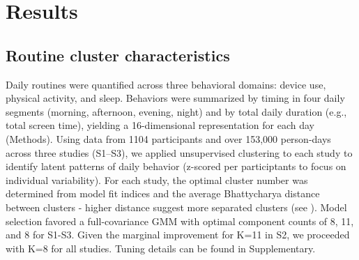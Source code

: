 \documentclass[pdflatex,sn-vancouver,Numbered]{bst/sn-jnl}%
\theoremstyle{thmstyleone}%
\theoremstyle{thmstyletwo}%
\theoremstyle{thmstylethree}%
\begin{document}
\section*{Results}\label{sec:results}  


\subsection*{Routine cluster characteristics}\label{sec:results:cluster}

Daily routines were quantified across three behavioral domains: device use, physical activity, and sleep. Behaviors were summarized by timing in four daily segments (morning, afternoon, evening, night) and by total daily duration (e.g., total screen time), yielding a 16-dimensional representation for each day (Methods). Using data from 1104 participants and over 153,000 person-days across three studies (S1–S3), we applied unsupervised clustering to each study to identify latent patterns of daily behavior (z-scored per participtants to focus on individual variability). For each study, the optimal cluster number was determined from model fit indices and the average Bhattycharya distance between clusters - higher distance suggest more separated clusters (see ). Model selection favored a full-covariance GMM with optimal component counts of 8, 11, and 8 for S1-S3. Given the marginal improvement for K=11 in S2, we proceeded with K=8 for all studies. Tuning details can be found in Supplementary.
\end{document}
